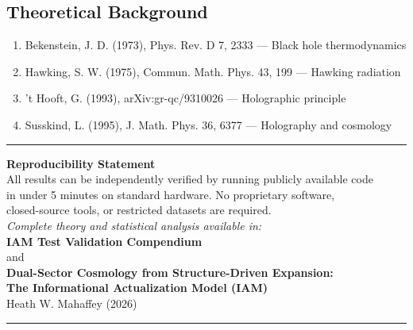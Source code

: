 \documentclass[11pt]{article}
\begin{document}
\subsection{Theoretical Background}

\begin{enumerate}
    \item Bekenstein, J. D. (1973), Phys. Rev. D 7, 2333 --- Black hole thermodynamics
    \item Hawking, S. W. (1975), Commun. Math. Phys. 43, 199 --- Hawking radiation
    \item 't Hooft, G. (1993), arXiv:gr-qc/9310026 --- Holographic principle
    \item Susskind, L. (1995), J. Math. Phys. 36, 6377 --- Holography and cosmology
\end{enumerate}


\vfill

\noindent\rule{\textwidth}{0.4pt}

\begin{center}
\textbf{Reproducibility Statement} \\[0.5em]
All results can be independently verified by running publicly available code \\
in under 5 minutes on standard hardware. No proprietary software, \\
closed-source tools, or restricted datasets are required. \\[1em]

\textit{Complete theory and statistical analysis available in:} \\
\textbf{IAM Test Validation Compendium} \\
and \\
\textbf{Dual-Sector Cosmology from Structure-Driven Expansion:} \\
\textbf{The Informational Actualization Model (IAM)} \\
Heath W. Mahaffey (2026)
\end{center}

\noindent\rule{\textwidth}{0.4pt}
\end{document}
